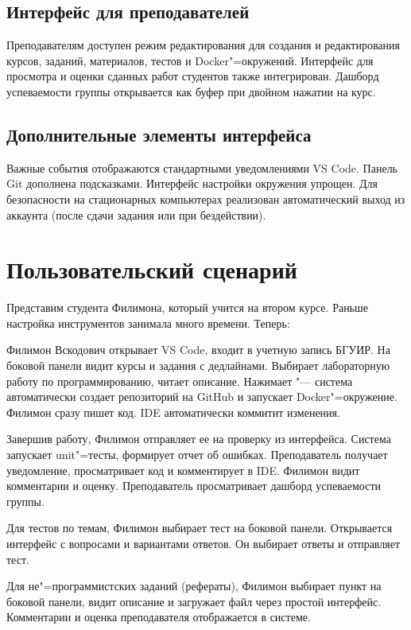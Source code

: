 \documentclass{bsuir}
\begin{document}
\subsection{Интерфейс для преподавателей}

Преподавателям доступен режим редактирования для создания и редактирования курсов,
заданий, материалов, тестов и Docker"=окружений. Интерфейс для просмотра и
оценки сданных работ студентов также интегрирован. Дашборд успеваемости группы
открывается как буфер при двойном нажатии на курс.

\subsection{Дополнительные элементы интерфейса}

Важные события отображаются стандартными уведомлениями VS Code. Панель Git
дополнена подсказками. Интерфейс настройки окружения упрощен. Для безопасности
на стационарных компьютерах реализован автоматический выход из аккаунта (после
сдачи задания или при бездействии).

\section{Пользовательский сценарий}

Представим студента Филимона, который учится на втором курсе. Раньше настройка
инструментов занимала много времени. Теперь:

Филимон Вскодович открывает VS Code, входит в учетную запись БГУИР. На боковой
панели  видит курсы и задания с дедлайнами. Выбирает
лабораторную работу по программированию, читает описание. Нажимает
 "--- система автоматически создает репозиторий на
GitHub и запускает Docker"=окружение. Филимон сразу пишет код. IDE автоматически
коммитит изменения.

Завершив работу, Филимон отправляет ее на проверку из интерфейса. Система
запускает unit"=тесты, формирует отчет об ошибках. Преподаватель получает
уведомление, просматривает код и комментирует в IDE. Филимон видит комментарии и
оценку. Преподаватель просматривает дашборд успеваемости группы.

Для тестов по темам, Филимон выбирает тест на боковой панели. Открывается
интерфейс с вопросами и вариантами ответов. Он выбирает ответы и отправляет
тест.

Для не"=программистских заданий (рефераты), Филимон выбирает пункт на боковой
панели, видит описание и загружает файл через простой интерфейс. Комментарии и
оценка преподавателя отображается в системе.
\end{document}
